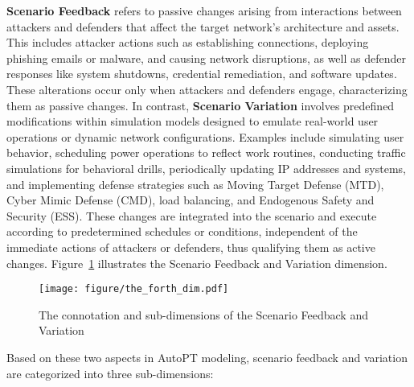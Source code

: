 \textbf{Scenario Feedback} refers to passive changes arising from interactions between attackers and defenders that affect the target network's architecture and assets. This includes attacker actions such as establishing connections, deploying phishing emails or malware, and causing network disruptions, as well as defender responses like system shutdowns, credential remediation, and software updates. These alterations occur only when attackers and defenders engage, characterizing them as passive changes.
In contrast, \textbf{Scenario Variation} involves predefined modifications within simulation models designed to emulate real-world user operations or dynamic network configurations. Examples include simulating user behavior, scheduling power operations to reflect work routines, conducting traffic simulations for behavioral drills, periodically updating IP addresses and systems, and implementing defense strategies such as Moving Target Defense (MTD), Cyber Mimic Defense (CMD), load balancing, and Endogenous Safety and Security (ESS). These changes are integrated into the scenario and execute according to predetermined schedules or conditions, independent of the immediate actions of attackers or defenders, thus qualifying them as active changes.
Figure~\ref{the_forth_dim} illustrates the Scenario Feedback and Variation dimension.


\begin{figure}[tb]
    \centering
    \texttt{[image: figure/the\_forth\_dim.pdf]}
    \caption{The connotation and sub-dimensions of the Scenario Feedback and Variation}
    \label{the_forth_dim}
\end{figure}

Based on these two aspects in AutoPT modeling, scenario feedback and variation are categorized into three sub-dimensions:

